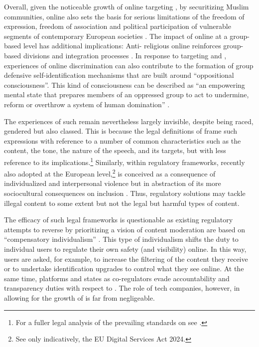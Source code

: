 \documentclass[output=paper,colorlinks,citecolor=brown]{langscibook}
\begin{document}
Overall, given the noticeable growth of online  targeting , by securitizing Muslim communities, online  also sets the basis for serious limitations of the freedom of expression, freedom of association and political participation of vulnerable segments of contemporary European societies \citep[21]{ecri2022}. The impact of online  at a group-based level has additional implications:  Anti- religious online  reinforces group-based divisions and integration processes \citep[3]{vidgen_yasseri_margetts2021}. In response to targeting and , experiences of online discrimination can also contribute to the formation of  group defensive self-identification mechanisms that are built around ``oppositional consciousness''. This kind of consciousness can be described as ``an empowering mental state that prepares members of an oppressed group to act to undermine, reform or overthrow a system of human domination'' \citep[4]{mansbridge_morris2001}.

The experiences of such  remain nevertheless largely invisible, despite being raced, gendered but also classed. This is because the legal definitions of  frame such expressions with reference to a number of common characteristics such as the content, the tone, the nature of the speech, and its targets, but with less reference to its implications.\footnote{%
For a fuller legal analysis of the prevailing standards on  see \citet{topidi2019_words2}.} 
Similarly, within regulatory frameworks, recently also adopted at the European level,\footnote{%
See only indicatively, the EU Digital Services Act 2024.} 
 is conceived as a consequence of individualized and interpersonal violence but in abstraction of its more sociocultural consequences on inclusion \citep{gillett_stardust_burgess2022}. Thus, regulatory solutions may tackle illegal content to some extent but not the legal but harmful types of content.

The efficacy of such legal frameworks is questionable as existing regulatory attempts to reverse  by prioritizing a vision of content moderation are based on ``compensatory individualism'' \citep{walcott2019}. This type of individualism shifts the duty to individual users to regulate their own safety (and visibility) online. In this way, users are asked, for example, to increase the filtering of the content they receive or to undertake identification upgrades to control what they see online. At the same time, platforms and states as co-regulators evade accountability and transparency duties with respect to . The role of tech companies, however, in allowing for the growth of  is far from negligeable.
\end{document}
